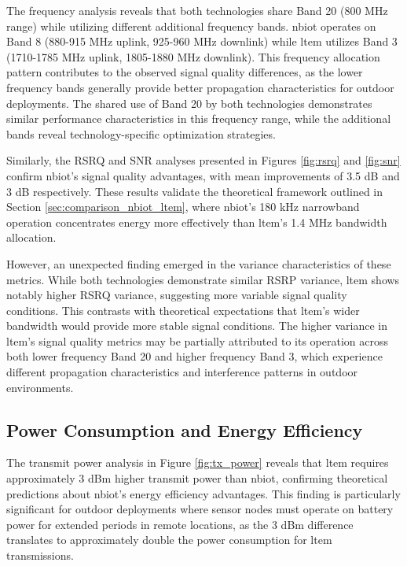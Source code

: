 \documentclass[12pt, english, openany]{book}
\begin{document}
The frequency analysis reveals that both technologies share Band 20 (800 MHz range) while utilizing different additional frequency bands. \gls{nbiot} operates on Band 8 (880-915 MHz uplink, 925-960 MHz downlink) while \gls{ltem} utilizes Band 3 (1710-1785 MHz uplink, 1805-1880 MHz downlink). This frequency allocation pattern contributes to the observed signal quality differences, as the lower frequency bands generally provide better propagation characteristics for outdoor deployments. The shared use of Band 20 by both technologies demonstrates similar performance characteristics in this frequency range, while the additional bands reveal technology-specific optimization strategies.

Similarly, the RSRQ and SNR analyses presented in Figures \ref{fig:rsrq} and \ref{fig:snr} confirm \gls{nbiot}'s signal quality advantages, with mean improvements of 3.5 dB and 3 dB respectively. These results validate the theoretical framework outlined in Section \ref{sec:comparison_nbiot_ltem}, where \gls{nbiot}'s 180 kHz narrowband operation concentrates energy more effectively than \gls{ltem}'s 1.4 MHz bandwidth allocation.

However, an unexpected finding emerged in the variance characteristics of these metrics. While both technologies demonstrate similar RSRP variance, \gls{ltem} shows notably higher RSRQ variance, suggesting more variable signal quality conditions. This contrasts with theoretical expectations that \gls{ltem}'s wider bandwidth would provide more stable signal conditions. The higher variance in \gls{ltem}'s signal quality metrics may be partially attributed to its operation across both lower frequency Band 20 and higher frequency Band 3, which experience different propagation characteristics and interference patterns in outdoor environments.

\subsection{Power Consumption and Energy Efficiency}

The transmit power analysis in Figure \ref{fig:tx_power} reveals that \gls{ltem} requires approximately 3 dBm higher transmit power than \gls{nbiot}, confirming theoretical predictions about \gls{nbiot}'s energy efficiency advantages. This finding is particularly significant for outdoor deployments where sensor nodes must operate on battery power for extended periods in remote locations, as the 3 dBm difference translates to approximately double the power consumption for \gls{ltem} transmissions.
\end{document}
